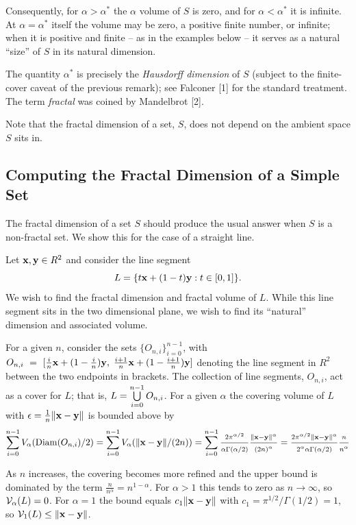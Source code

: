 Consequently, for $\alpha > \alpha^*$ the $\alpha$ volume of $S$ is zero,
and for $\alpha < \alpha^*$ it is infinite. At $\alpha = \alpha^*$ itself
the volume may be zero, a positive finite number, or infinite; when it is
positive and finite -- as in the examples below -- it serves as a natural
``size'' of $S$ in its natural dimension.

The quantity $\alpha^*$ is precisely the {\it Hausdorff dimension\/} of
$S$ (subject to the finite-cover caveat of the previous remark); see
Falconer [1] for the standard treatment. The term {\it fractal\/} was
coined by Mandelbrot [2].

Note that the fractal dimension of a set, $S$, does not depend on
the ambient space $S$ sits in.

\subsection{Computing the Fractal Dimension of a Simple Set}

The fractal dimension of a set $S$ should produce the usual
answer when $S$ is a non-fractal set. We show this for the case of a
straight line.

Let ${\bf x}, {\bf y} \in R^2$ and consider the line segment
$$
L = \{t{\bf x} + (1-t){\bf y} : t \in [0,1]\}.
$$
We wish to find the fractal dimension and fractal volume of $L$.
While this line segment sits in the two dimensional plane, we wish 
to find its ``natural'' dimension and associated volume.

For a given $n$, consider the sets $\{O_{n,i}\}_{i=0}^{n-1}$, with $O_{n,i}~=~
[\frac{i}{n}{\bf x} + (1-\frac{i}{n}){\bf y}, \; \frac{i+1}{n}{\bf x} + (1 -
\frac{i+1}{n}){\bf y}]$ denoting the line segment in $R^2$ between the two
endpoints in brackets. The collection of line segments, $O_{n,i}$, act
as a cover for $L$; that is, $L =
\bigcup_{i=0}^{n-1}\limits O_{n,i}$. For a given $\alpha$ the
covering volume of $L$ with $\epsilon = \frac{1}{n} \|{\bf x} - {\bf y}\|$ 
is bounded above by
$$
\sum_{i=0}^{n-1} V_\alpha({\rm Diam}(O_{n,i})/2) = \sum_{i=0}^{n-1}
V_\alpha(\|{\bf x} - {\bf y}\|/(2n)) =  \sum_{i=0}^{n-1} \frac{2
\pi^{\alpha / 2}}{\alpha \Gamma(\alpha / 2)} \frac{\|{\bf x} - {\bf
y}\|^\alpha}{(2n)^\alpha} = \frac{2 \pi^{\alpha / 2} \|{\bf x} - {\bf
y}\|^\alpha}{2^\alpha \alpha \Gamma(\alpha / 2)} \frac{n}{n^\alpha}
$$

As $n$ increases, the covering becomes more refined and
the upper bound is dominated by the term
$\frac{n}{n^\alpha} = n^{1-\alpha}$. For $\alpha > 1$ this tends to zero
as $n \to \infty$, so ${\cal V}_\alpha(L) = 0$. For $\alpha = 1$ the bound
equals $c_1 \|{\bf x} - {\bf y}\|$ with $c_1 = \pi^{1/2}/\Gamma(1/2) = 1$,
so ${\cal V}_1(L) \le \|{\bf x} - {\bf y}\|$.

